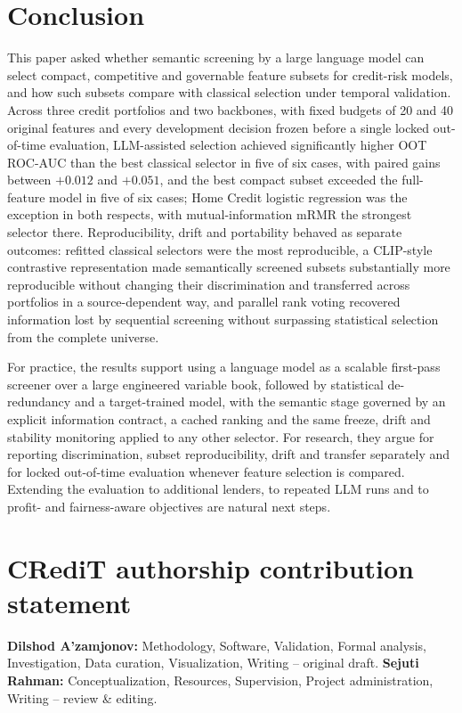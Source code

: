 \documentclass[final,5p,twocolumn]{elsarticle}
\begin{document}
\section{Conclusion}
\label{sec:conclusion}

This paper asked whether semantic screening by a large language model can select compact, competitive and governable feature subsets for credit-risk models, and how such subsets compare with classical selection under temporal validation. Across three credit portfolios and two backbones, with fixed budgets of 20 and 40 original features and every development decision frozen before a single locked out-of-time evaluation, LLM-assisted selection achieved significantly higher OOT ROC-AUC than the best classical selector in five of six cases, with paired gains between $+0.012$ and $+0.051$, and the best compact subset exceeded the full-feature model in five of six cases; Home Credit logistic regression was the exception in both respects, with mutual-information mRMR the strongest selector there. Reproducibility, drift and portability behaved as separate outcomes: refitted classical selectors were the most reproducible, a CLIP-style contrastive representation made semantically screened subsets substantially more reproducible without changing their discrimination and transferred across portfolios in a source-dependent way, and parallel rank voting recovered information lost by sequential screening without surpassing statistical selection from the complete universe.

For practice, the results support using a language model as a scalable first-pass screener over a large engineered variable book, followed by statistical de-redundancy and a target-trained model, with the semantic stage governed by an explicit information contract, a cached ranking and the same freeze, drift and stability monitoring applied to any other selector. For research, they argue for reporting discrimination, subset reproducibility, drift and transfer separately and for locked out-of-time evaluation whenever feature selection is compared. Extending the evaluation to additional lenders, to repeated LLM runs and to profit- and fairness-aware objectives are natural next steps.


\section*{CRediT authorship contribution statement}
\textbf{Dilshod A'zamjonov:} Methodology, Software, Validation, Formal analysis, Investigation, Data curation, Visualization, Writing -- original draft. \textbf{Sejuti Rahman:} Conceptualization, Resources, Supervision, Project administration, Writing -- review \& editing.
\end{document}
